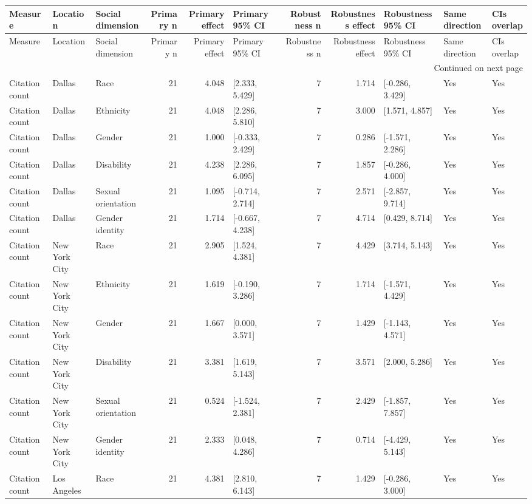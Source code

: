 \begin{longtable}{lllrrlrrlll}
\toprule
Measure & Location & Social dimension & Primary n & Primary effect & Primary 95\% CI & Robustness n & Robustness effect & Robustness 95\% CI & Same direction & CIs overlap \\
\midrule
\endfirsthead
\toprule
Measure & Location & Social dimension & Primary n & Primary effect & Primary 95\% CI & Robustness n & Robustness effect & Robustness 95\% CI & Same direction & CIs overlap \\
\midrule
\endhead
\midrule
\multicolumn{11}{r}{Continued on next page} \\
\midrule
\endfoot
\bottomrule
\endlastfoot
Citation count & Dallas & Race & 21 & 4.048 & [2.333, 5.429] & 7 & 1.714 & [-0.286, 3.429] & Yes & Yes \\
Citation count & Dallas & Ethnicity & 21 & 4.048 & [2.286, 5.810] & 7 & 3.000 & [1.571, 4.857] & Yes & Yes \\
Citation count & Dallas & Gender & 21 & 1.000 & [-0.333, 2.429] & 7 & 0.286 & [-1.571, 2.286] & Yes & Yes \\
Citation count & Dallas & Disability & 21 & 4.238 & [2.286, 6.095] & 7 & 1.857 & [-0.286, 4.000] & Yes & Yes \\
Citation count & Dallas & Sexual orientation & 21 & 1.095 & [-0.714, 2.714] & 7 & 2.571 & [-2.857, 9.714] & Yes & Yes \\
Citation count & Dallas & Gender identity & 21 & 1.714 & [-0.667, 4.238] & 7 & 4.714 & [0.429, 8.714] & Yes & Yes \\
Citation count & New York City & Race & 21 & 2.905 & [1.524, 4.381] & 7 & 4.429 & [3.714, 5.143] & Yes & Yes \\
Citation count & New York City & Ethnicity & 21 & 1.619 & [-0.190, 3.286] & 7 & 1.714 & [-1.571, 4.429] & Yes & Yes \\
Citation count & New York City & Gender & 21 & 1.667 & [0.000, 3.571] & 7 & 1.429 & [-1.143, 4.571] & Yes & Yes \\
Citation count & New York City & Disability & 21 & 3.381 & [1.619, 5.143] & 7 & 3.571 & [2.000, 5.286] & Yes & Yes \\
Citation count & New York City & Sexual orientation & 21 & 0.524 & [-1.524, 2.381] & 7 & 2.429 & [-1.857, 7.857] & Yes & Yes \\
Citation count & New York City & Gender identity & 21 & 2.333 & [0.048, 4.286] & 7 & 0.714 & [-4.429, 5.143] & Yes & Yes \\
Citation count & Los Angeles & Race & 21 & 4.381 & [2.810, 6.143] & 7 & 1.429 & [-0.286, 3.000] & Yes & Yes \\

\end{longtable}
